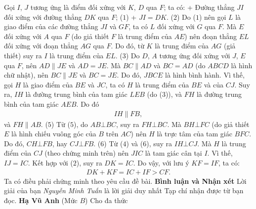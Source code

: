 \begin{multicols}{2}
\begin{figure}[H]
		\vspace*{-10pt}
	\end{figure}
	Gọi $I$, $J$ tương ứng là điểm đối xứng với $K$, $D$ qua $F$; ta có:
	\vskip 0.05cm
	+ Đường thẳng $JI$ đối xứng với đường thẳng $DK$ qua $F$; \hfill ($1$)
	\vskip 0.05cm
	+ $JI = DK$. \hfill ($2$)
	\vskip 0.05cm
	Do ($1$) nên gọi $L$ là giao điểm của các đường thẳng $JI$ và $GF$, ta có $L$ đối xứng với $G$ qua $F$. Mà $E$ đối xứng với $A$ qua $F$ (do giả thiết $F$ là trung điểm của $AE$) nên đoạn thẳng $EL$ đối xứng với đoạn thẳng $AG$ qua $F$. Do đó, từ $K$ là trung điểm của $AG$ (giả thiết) suy ra $I$ là trung điểm của $EL$. \hfill ($3$)
	\vskip 0.05cm
	Do $D$, $A$ tương ứng đối xứng với $J$, $E$ qua $F$, nên $AD \parallel JE$ và $AD = JE$. Mà $BC \parallel AD$ và $BC = AD$ (do $ABCD$ là hình chữ nhật), nên $BC \parallel JE$ và $BC = JE$. Do đó, $JBCE$ là hình bình hành. Vì thế, gọi $H$ là giao điểm của $BE$ và $JC$, ta có $H$ là trung điểm của $BE$ và của $CJ$. Suy ra, $IH$ là đường trung bình của tam giác $LEB$ (do ($3$)), và $FH$ là đường trung bình của tam giác $AEB$. Do đó
	\begin{align*}
		IH \parallel FB, \tag{$4$}
	\end{align*}
	và \hspace*{60.5pt}  $FH \parallel AB$. \hfill ($5$)
	\vskip 0.05cm
	Từ ($5$), do $AB \bot BC$, suy ra $FH \bot BC$. Mà $BH \bot FC$ (do giả thiết $E$ là hình chiếu vuông góc của $B$ trên $AC$) nên $H$ là trực tâm của tam giác $BFC$. Do đó, $CH \bot FB$, hay $CJ \bot FB$. \hfill ($6$)
	\vskip 0.05cm
	Từ ($4$) và ($6$), suy ra $IH \bot CJ$. Mà $H$ là trung điểm của $CJ$ (theo chứng minh trên) nên $JIC$ là tam giác cân tại $I$. Vì thế, $IJ = IC$. Kết hợp với ($2$), suy ra $DK = IC$. Do vậy, với lưu ý $KF = IF$, ta có:
	\begin{align*}
		DK + KF = IC + IF > CF.
	\end{align*}
	Ta có điều phải chứng minh theo yêu cầu đề bài.
	\vskip 0.05cm
	\textbf{\color{thachthuctoanhoc}Bình luận và Nhận xét}
	\vskip 0.05cm
	Lời giải của bạn \textit{Nguyễn Minh Tuấn} là lời giải duy nhất Tạp chí nhận được từ bạn đọc.
	\vskip 0.1cm
	\hfill	\textbf{\color{thachthuctoanhoc}Hạ Vũ Anh}
	\vskip 0.1cm
	{}
	(Mức $B$) Cho đa thức
	\begin{align*}

\end{align*}
\end{multicols}
